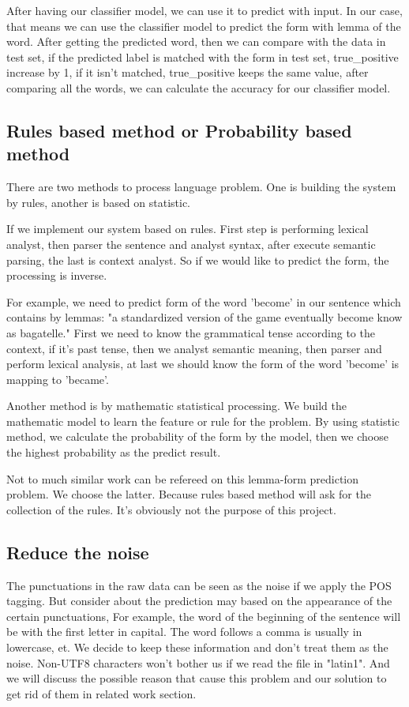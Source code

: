 \documentclass[a4paper]{article}
\begin{document}
After having our classifier model, we can use it to predict with input. In our case, that means we can use the classifier model to predict the form with lemma of the word. After getting the predicted word, then we can compare with the data in test set, if the predicted label is matched with the form in test set, true\_positive increase by 1, if it isn't matched, true\_positive keeps the same value, after comparing all the words, we can calculate the accuracy for our classifier model. 

\subsection{Rules based method or Probability based method}

There are two methods to process language problem. One is building the system by rules, another is based on statistic.

If we implement our system based on rules. First step is performing lexical analyst, then parser the sentence and analyst syntax, after execute semantic parsing, the last is context analyst. So if we would like to predict the form, the processing is inverse. 

For example, we need to predict form of the word 'become' in our sentence which contains by lemmas: "a standardized version of the game eventually become know as bagatelle."
First we need to know the grammatical tense according to the context, if it's past tense, then we analyst semantic meaning, then parser and perform lexical analysis, at last we should know the form of the word 'become' is mapping to 'became'.

Another method is by mathematic statistical processing. We build the mathematic model to learn the feature or rule for the problem. By using statistic method, we calculate the probability of the form by the model, then we choose the highest probability as the predict result. 

Not to much similar work can be refereed on this lemma-form prediction problem. We choose the latter. Because rules based method will ask for the collection of the rules. It's obviously not the purpose of this project.

\subsection{Reduce the noise}
The punctuations in the raw data can be seen as the noise 
if we apply the POS tagging. But consider about the prediction may based on the appearance of the certain punctuations, For example, the word of the beginning of the sentence will be with the first letter in capital. The word follows a comma is usually in lowercase, et. We decide to keep these information and don't treat them as the noise.
Non-UTF8 characters won't bother us if we read the file in "latin1". And we will discuss the possible reason that cause this problem and our solution to get rid of them in related work section.
\end{document}
